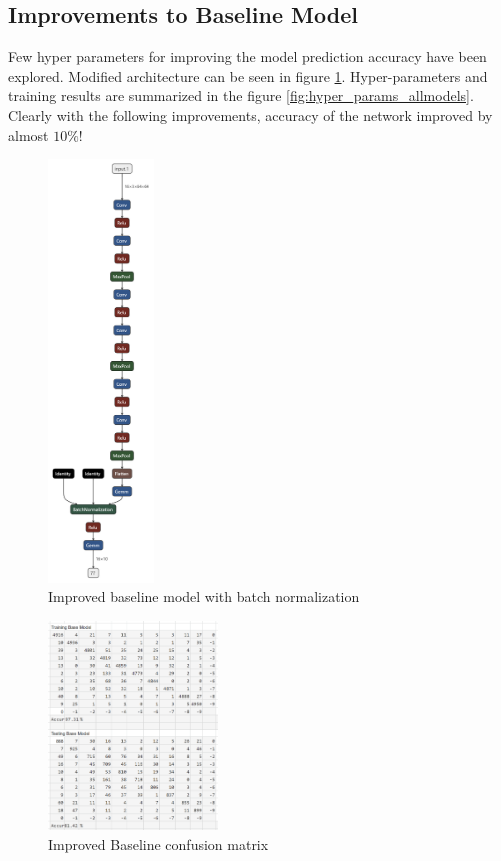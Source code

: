 \documentclass[conference]{IEEEtran}
\begin{document}
		\subsection{Improvements to Baseline Model}
		Few hyper parameters for improving the model prediction accuracy have been explored. Modified architecture can be seen in figure \ref{fig:batch_norm_model}. Hyper-parameters and training results are summarized in the figure  \ref{fig:hyper_params_allmodels}. Clearly with the following improvements, accuracy of the network improved by almost $10\%$!
		
		\begin{figure}
			\centering
			\includegraphics[width=0.25\textwidth]{models/batchnorm.png}
			\caption{Improved baseline model with batch normalization}
			\label{fig:batch_norm_model}
		\end{figure}
	
	
		\begin{figure}
			\centering
			\includegraphics[width=0.4\textwidth]{CM/batch_norm.png}
			\caption{Improved Baseline confusion matrix}
			\label{fig:base_line_model}
		\end{figure}
		
\end{document}
